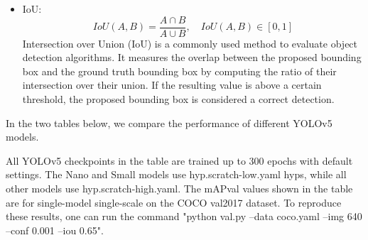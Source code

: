 \begin{itemize}
\begin{itemize}
\item IoU:
\begin{equation}
IoU(A,B) = \frac{A \cap B}{A \cup B}, \quad IoU(A,B) \in [0,1]
\end{equation}
Intersection over Union (IoU) is a commonly used method to evaluate object detection algorithms. It measures the overlap between the proposed bounding box and the ground truth bounding box by computing the ratio of their intersection over their union. If the resulting value is above a certain threshold, the proposed bounding box is considered a correct detection.\cite{MG21}
\end{itemize}
In the two tables below, we compare the performance of different YOLOv5 models.
\FloatBarrier
\begin{table}[h]

\centering
{}

\label{tab:yolov5_comparison1}
\vspace{0.5cm}

\footnotesize All YOLOv5 checkpoints in the table are trained up to 300 epochs with default settings. The Nano and Small models use hyp.scratch-low.yaml hyps, while all other models use hyp.scratch-high.yaml. The mAPval values shown in the table are for single-model single-scale on the COCO val2017 dataset. To reproduce these results, one can run the command "python val.py --data coco.yaml --img 640 --conf 0.001 --iou 0.65".\cite{U23}


\end{table}
\end{itemize}
